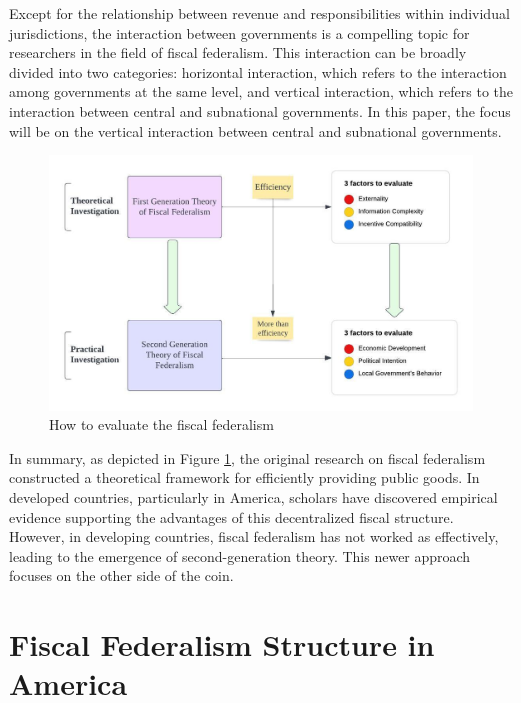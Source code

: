 Except for the relationship between revenue and responsibilities within individual jurisdictions, the interaction between governments is a compelling topic for researchers in the field of fiscal federalism. This interaction can be broadly divided into two categories: horizontal interaction, which refers to the interaction among governments at the same level, and vertical interaction, which refers to the interaction between central and subnational governments. In this paper, the focus will be on the vertical interaction between central and subnational governments.


\begin{figure}[H]
  \centering
  \includegraphics[scale=1]{Chapter-2/Figures/how to evaluate the fiscal federalism.jpeg}
  \caption[How to evaluate the fiscal federalism]{How to evaluate the fiscal federalism
    \texttt{} }
  \label{Figure 1.2}
\end{figure}

In summary, as depicted in Figure \ref*{Figure 1.2}, the original research on fiscal federalism constructed a theoretical framework for efficiently providing public goods. In developed countries, particularly in America, scholars have discovered empirical evidence supporting the advantages of this decentralized fiscal structure. However, in developing countries, fiscal federalism has not worked as effectively, leading to the emergence of second-generation theory. This newer approach focuses on the other side of the coin.


\section{Fiscal Federalism Structure in America}
